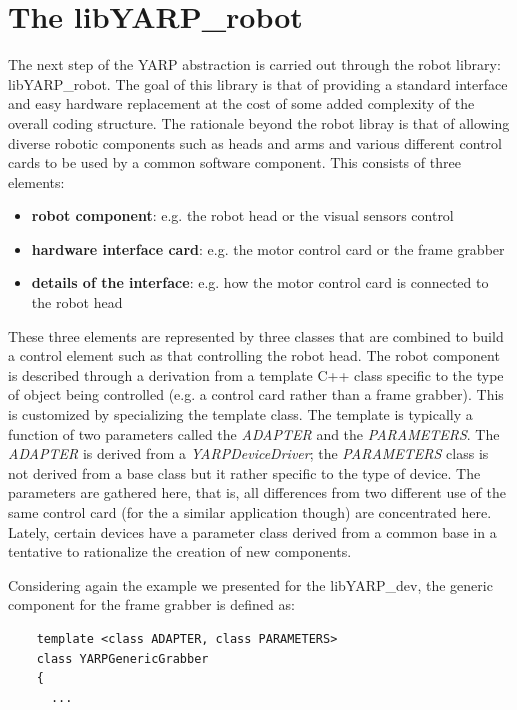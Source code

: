 \section{The libYARP\_robot}
The next step of the YARP abstraction is carried out through the robot library: libYARP\_robot. The goal of this library is that of providing a standard interface and easy hardware replacement at the cost of some added complexity of the overall coding structure. The rationale beyond the robot libray is that of allowing diverse robotic components such as heads and arms and various different control cards to be used by a common software component. This consists of three elements:

\begin{itemize}
\item {\bf robot component}: e.g. the robot head or the visual sensors control
\item {\bf hardware interface card}: e.g. the motor control card or the frame grabber
\item {\bf details of the interface}: e.g. how the motor control card is connected to the robot head
\end{itemize}

These three elements are represented by three classes that are combined to build a control element such as that controlling the robot head. The robot component is described through a derivation from a template C++ class specific to the type of object being controlled (e.g. a control card rather than a frame grabber). This is customized by specializing the template class. The template is typically a function of two parameters called the {\em ADAPTER} and the {\em PARAMETERS}. The {\em ADAPTER} is derived from a {\em YARPDeviceDriver}; the {\em PARAMETERS} class is not derived from a base class but it rather specific to the type of device. The parameters are gathered here, that is, all differences from two different use of the same control card (for the a similar application though) are concentrated here. Lately, certain devices have a parameter class derived from a common base in a tentative to rationalize the creation of new components. 

Considering again the example we presented for the libYARP\_dev, the generic component for the frame grabber is defined as:

\begin{verbatim}
    template <class ADAPTER, class PARAMETERS>
    class YARPGenericGrabber
    {
      ...
\end{verbatim}

